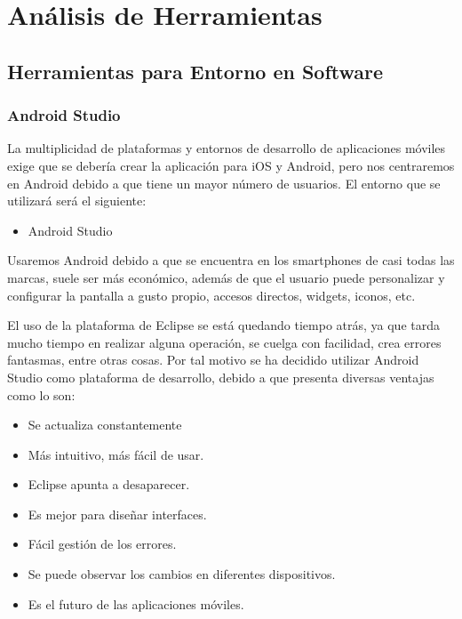 \section{Análisis de Herramientas}
\subsection{Herramientas para Entorno en Software}
\subsubsection{Android Studio}
La multiplicidad de plataformas y entornos de desarrollo de aplicaciones móviles exige que se debería crear la aplicación para iOS y Android, pero nos centraremos en Android debido a que tiene un mayor número de usuarios. El entorno que se utilizará será el siguiente:
\begin{itemize}
    \item Android Studio
\end{itemize} \par
Usaremos Android debido a que se encuentra en los smartphones de casi todas las marcas, suele ser más económico, además de que el usuario puede personalizar y configurar la pantalla a gusto propio, accesos directos, widgets, iconos, etc. \par
El uso de la plataforma de Eclipse se está quedando tiempo atrás, ya que tarda mucho tiempo en realizar alguna operación, se cuelga con facilidad, crea errores fantasmas, entre otras cosas. Por tal motivo se ha decidido utilizar Android Studio como plataforma de desarrollo, debido a que presenta diversas ventajas como lo son:
\begin{itemize}
    \item Se actualiza constantemente
    \item Más intuitivo, más fácil de usar.
    \item Eclipse apunta a desaparecer.
    \item Es mejor para diseñar interfaces.
    \item Fácil gestión de los errores.
    \item Se puede observar los cambios en diferentes dispositivos.
    \item Es el futuro de las aplicaciones móviles.
\end{itemize}